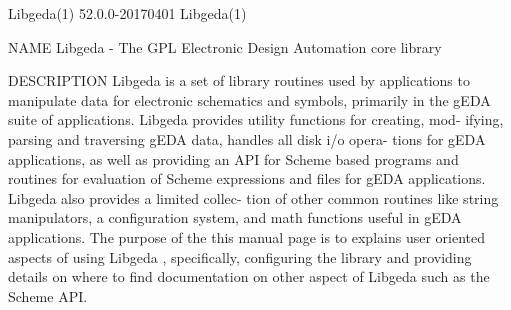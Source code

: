 Libgeda(1)                      52.0.0-20170401                     Libgeda(1)



NAME
       Libgeda - The GPL Electronic Design Automation core library

DESCRIPTION
       Libgeda is a set of library routines used by applications to manipulate
       data for electronic schematics and symbols, primarily in the gEDA suite
       of applications.  Libgeda provides utility functions for creating, mod-
       ifying, parsing and traversing gEDA data, handles all disk  i/o  opera-
       tions  for  gEDA  applications,  as well as providing an API for Scheme
       based programs and routines for evaluation of  Scheme  expressions  and
       files  for  gEDA applications.  Libgeda also provides a limited collec-
       tion of other common routines like string manipulators, a configuration
       system,  and math functions useful in gEDA applications. The purpose of
       the this manual page is to explains  user  oriented  aspects  of  using
       Libgeda  ,  specifically, configuring the library and providing details
       on where to find documentation on other aspect of Libgeda such  as  the
       Scheme API.

